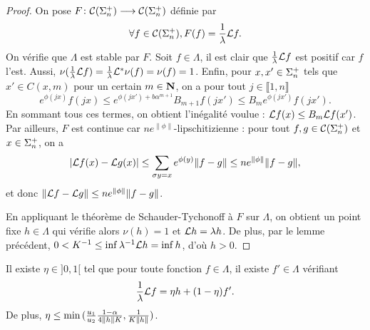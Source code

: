   \begin{proof}
    On pose $F \colon \Csp{n} \longrightarrow \Csp{n}$ définie par
    $$\forall f \in \Csp{n}, F(f) = \frac 1 \lambda \L f.$$
    On vérifie que $\Lambda$ est stable par $F$. Soit $f \in \Lambda$,
    il est clair que $\frac 1 \lambda \L f$ est positif car $f$ l'est. Aussi,
    $\nu(\frac 1 \lambda \L f) = \frac 1 \lambda \L^*\nu(f) = \nu(f) = 1$.
    Enfin, pour $x, x' \in \sp_n$ tels que $x' \in C(x,m)$ pour un certain $m \in \N$, on a pour tout $j \in \llbracket 1, n\rrbracket$
    $$e^{\phi(jx)}f(jx) \leq e^{\phi(jx') + b\alpha^{m+1}}B_{m+1}f(jx') \leq B_me^{\phi(jx')}f(jx').$$
    En sommant tous ces termes, on obtient l'inégalité voulue : $\L f(x) \leq B_m\L f(x')$.
    Par ailleurs, $F$ est continue car $ne^{\lVert\phi\rVert}$-lipschitizienne : pour tout $f,g \in \Csp{n}$ et $x\in\sp_n$, on a
    $$\left|\L f(x) - \L g(x) \right| \leq \sum_{\sigma y = x}{e^{\phi(y)}\lVert f-g\rVert} \leq ne^{\lVert\phi\rVert}\lVert f-g\rVert,$$
    et donc $\lVert\L f - \L g\rVert \leq ne^{\lVert\phi\rVert}\lVert f-g\rVert$.

    En appliquant le théorème de Schauder-Tychonoff à $F$ sur $\Lambda$, on obtient un point fixe $h \in \Lambda$
    qui vérifie alors $\nu(h) = 1$ et $\L h = \lambda h$. De plus, par le lemme précédent,
    $0 < K^{-1} \leq \inf{\lambda^{-1}\L h} = \inf{h}$, d'où $h > 0$.
  \end{proof}


  \begin{lemma}
    \label{lem:Lf_decomp}
    \leanok
    Il existe $\eta \in ]0, 1[$ tel que pour toute fonction $f \in \Lambda$, il existe $f' \in \Lambda$ vérifiant
    $$\frac 1 \lambda \L f = \eta h + (1-\eta)f'.$$
    De plus, $\eta \leq \min{(\frac{u_1}{u_2} \frac{1-\alpha}{4\No{h}K}, \frac 1 {K\lVert h\rVert})}$.
  \end{lemma}

